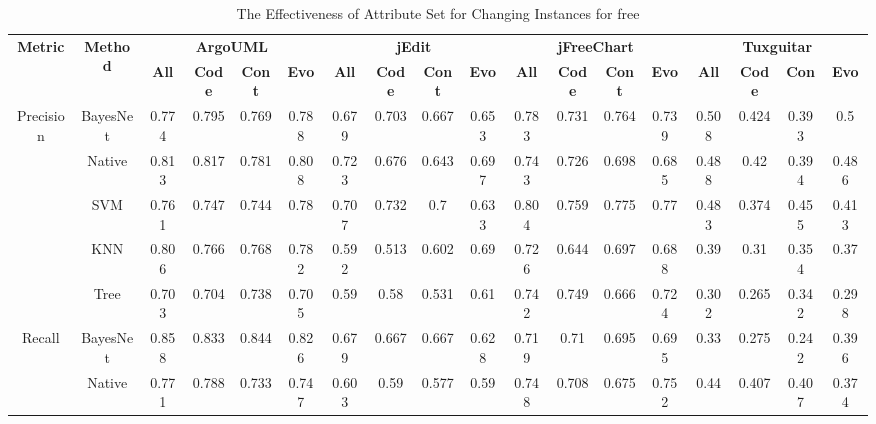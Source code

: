 {\begin{table*}[ht]
\scriptsize
\caption{The Effectiveness of Attribute Set for Changing Instances for free}
\label{changingsetfree}
\centering
\begin{tabular}{|c|c|c|c|c|c|c|c|c|c|c|c|c|c|c|c|c|c|}
\hline
\multirow{2}{*}{\textbf{Metric}}&\multirow{2}{*}{\textbf{Method}}&\multicolumn{4}{|c|}{\textbf{ArgoUML}}&\multicolumn{4}{|c|}{\textbf{jEdit}}&\multicolumn{4}{|c|}{\textbf{jFreeChart}}&\multicolumn{4}{|c|}{\textbf{Tuxguitar}}\\
\cline{3-18}
&&\textbf{All}&\textbf{Code}&\textbf{Cont}&\textbf{Evo}&\textbf{All}&\textbf{Code}&\textbf{Cont}&\textbf{Evo}&\textbf{All}&\textbf{Code}&\textbf{Cont}&\textbf{Evo}&\textbf{All}&\textbf{Code}&\textbf{Con}&\textbf{Evo}~\\
\hline
\multirow{5}{*}{Precision}
&BayesNet&0.774&	0.795	&0.769	&0.788		&0.679	&0.703	&0.667	&0.653		&0.783	&0.731	&0.764	&0.739	&	0.508	&0.424	&0.393	&0.5\\
&Native&0.813	&0.817	&0.781&	0.808	&	0.723	&0.676	&0.643	&0.697	&	0.743	&0.726&	0.698&	0.685	&	0.488	&0.42	&0.394	&0.486\\
&SVM&	0.761	&0.747	&0.744	&0.78	&	0.707	&0.732	&0.7	&0.633		&0.804	&0.759	&0.775	&0.77	&	0.483&	0.374	&0.455	&0.413\\
&KNN&	0.806	&0.766	&0.768	&0.782	&	0.592	&0.513	&0.602	&0.69		&0.726	&0.644	&0.697	&0.688		&0.39	&0.31	&0.354	&0.37\\
&Tree&	0.703&	0.704	&0.738	&0.705	&	0.59	&0.58&	0.531	&0.61		&0.742	&0.749	&0.666	&0.724		&0.302	&0.265	&0.342	&0.298\\
\hline
\multirow{5}{*}{Recall}
&BayesNet&0.858&	0.833	&0.844	&0.826	&	0.679&	0.667	&0.667	&0.628	&	0.719	&0.71	&0.695	&0.695&		0.33	&0.275	&0.242&	0.396\\
&Native&0.771	&0.788	&0.733	&0.747	&	0.603&	0.59&	0.577	&0.59	&	0.748	&0.708	&0.675	&0.752	&	0.44	&0.407	&0.407&	0.374\\

\end{tabular}
\end{table*}}
